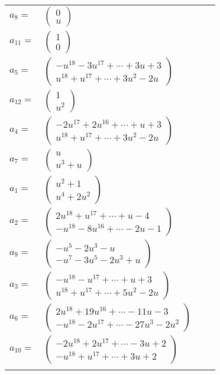 \documentclass[1p]{elsarticle_modified}
\theoremstyle{definition}
\begin{document}
\begin{tabular}{m{7pt} m{180pt} m{7pt} m{180pt} }
\flushright $a_{8}=$&$\begin{pmatrix}0\\u\end{pmatrix}$ \\
\flushright $a_{11}=$&$\begin{pmatrix}1\\0\end{pmatrix}$ \\
\flushright $a_{5}=$&$\begin{pmatrix}- u^{18}-3 u^{17}+\cdots+3 u+3\\u^{18}+u^{17}+\cdots+3 u^2-2 u\end{pmatrix}$ \\
\flushright $a_{12}=$&$\begin{pmatrix}1\\u^2\end{pmatrix}$ \\
\flushright $a_{4}=$&$\begin{pmatrix}-2 u^{17}+2 u^{16}+\cdots+u+3\\u^{18}+u^{17}+\cdots+3 u^2-2 u\end{pmatrix}$ \\
\flushright $a_{7}=$&$\begin{pmatrix}u\\u^3+u\end{pmatrix}$ \\
\flushright $a_{1}=$&$\begin{pmatrix}u^2+1\\u^4+2 u^2\end{pmatrix}$ \\
\flushright $a_{2}=$&$\begin{pmatrix}2 u^{18}+u^{17}+\cdots+u-4\\- u^{18}-8 u^{16}+\cdots-2 u-1\end{pmatrix}$ \\
\flushright $a_{9}=$&$\begin{pmatrix}- u^5-2 u^3- u\\- u^7-3 u^5-2 u^3+u\end{pmatrix}$ \\
\flushright $a_{3}=$&$\begin{pmatrix}- u^{18}- u^{17}+\cdots+u+3\\u^{18}+u^{17}+\cdots+5 u^2-2 u\end{pmatrix}$ \\
\flushright $a_{6}=$&$\begin{pmatrix}2 u^{18}+19 u^{16}+\cdots-11 u-3\\- u^{18}-2 u^{17}+\cdots-27 u^3-2 u^2\end{pmatrix}$ \\
\flushright $a_{10}=$&$\begin{pmatrix}-2 u^{18}+2 u^{17}+\cdots-3 u+2\\- u^{18}+u^{17}+\cdots+3 u+2\end{pmatrix}$\\&\end{tabular}
\end{document}
